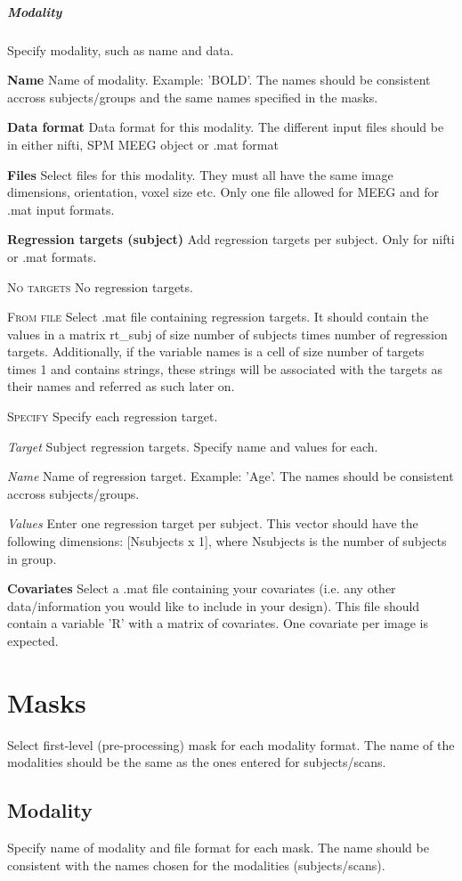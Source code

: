 \subparagraph{Modality}
Specify modality, such as name and data.


\textbf{Name}
Name of modality. Example: 'BOLD'. The names should be consistent accross subjects/groups and the same names specified in the masks.


\textbf{Data format}
Data format for this modality. The different input files should be in either nifti, SPM MEEG object or .mat format


\textbf{Files}
Select files for this modality. They must all have the same image dimensions, orientation, voxel size etc. Only one file allowed for MEEG and for .mat input formats.


\textbf{Regression targets (subject)}
Add regression targets per subject. Only for nifti or .mat formats.


\textsc{No targets}
No regression targets.


\textsc{From file}
Select .mat file containing regression targets. It should contain the values in a matrix rt\_subj of size number of subjects times number of regression targets. Additionally, if the variable names is a cell of size number of targets times 1 and contains strings, these strings will be associated with the targets as their names and referred as such later on.


\textsc{Specify}
Specify each regression target.


\textsl{Target}
Subject regression targets. Specify name and values for each.


\textit{Name}
Name of regression target. Example: 'Age'. The names should be consistent accross subjects/groups.


\textit{Values}
Enter one regression target per subject. This vector should have the following dimensions: [Nsubjects x 1], where Nsubjects is the number of subjects in group.


\textbf{Covariates}
Select a .mat file containing your covariates (i.e. any other data/information you would like to include in your design). This file should contain a variable 'R' with a matrix of covariates. One covariate per image is expected.


\section{Masks}
Select first-level (pre-processing) mask for each modality format. The name of the modalities should be the same as the ones entered for subjects/scans.


\subsection{Modality}
Specify name of modality and file format for each mask. The name should be consistent with the names chosen for the modalities (subjects/scans).



